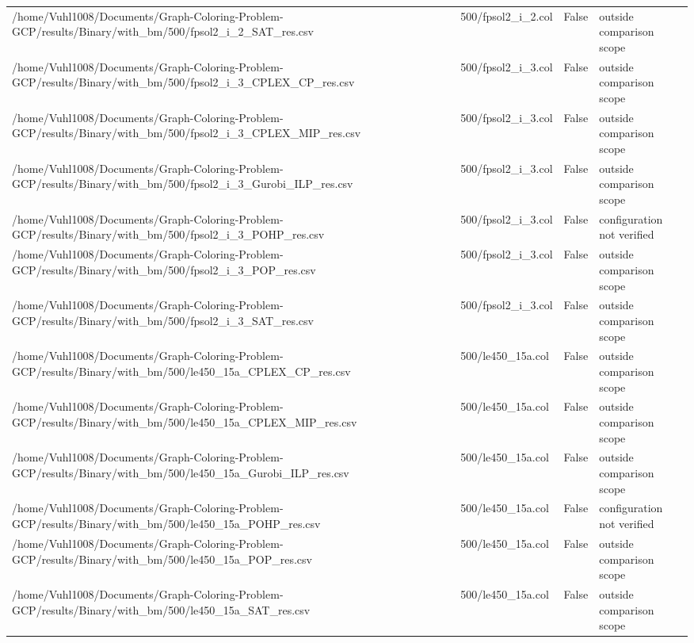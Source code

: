 \begin{table}[htbp]
\begin{tabular}{llll}
/home/Vuhl1008/Documents/Graph-Coloring-Problem-GCP/results/Binary/with\_bm/500/fpsol2\_i\_2\_SAT\_res.csv & 500/fpsol2\_i\_2.col & False & outside comparison scope \\
/home/Vuhl1008/Documents/Graph-Coloring-Problem-GCP/results/Binary/with\_bm/500/fpsol2\_i\_3\_CPLEX\_CP\_res.csv & 500/fpsol2\_i\_3.col & False & outside comparison scope \\
/home/Vuhl1008/Documents/Graph-Coloring-Problem-GCP/results/Binary/with\_bm/500/fpsol2\_i\_3\_CPLEX\_MIP\_res.csv & 500/fpsol2\_i\_3.col & False & outside comparison scope \\
/home/Vuhl1008/Documents/Graph-Coloring-Problem-GCP/results/Binary/with\_bm/500/fpsol2\_i\_3\_Gurobi\_ILP\_res.csv & 500/fpsol2\_i\_3.col & False & outside comparison scope \\
/home/Vuhl1008/Documents/Graph-Coloring-Problem-GCP/results/Binary/with\_bm/500/fpsol2\_i\_3\_POHP\_res.csv & 500/fpsol2\_i\_3.col & False & configuration not verified \\
/home/Vuhl1008/Documents/Graph-Coloring-Problem-GCP/results/Binary/with\_bm/500/fpsol2\_i\_3\_POP\_res.csv & 500/fpsol2\_i\_3.col & False & outside comparison scope \\
/home/Vuhl1008/Documents/Graph-Coloring-Problem-GCP/results/Binary/with\_bm/500/fpsol2\_i\_3\_SAT\_res.csv & 500/fpsol2\_i\_3.col & False & outside comparison scope \\
/home/Vuhl1008/Documents/Graph-Coloring-Problem-GCP/results/Binary/with\_bm/500/le450\_15a\_CPLEX\_CP\_res.csv & 500/le450\_15a.col & False & outside comparison scope \\
/home/Vuhl1008/Documents/Graph-Coloring-Problem-GCP/results/Binary/with\_bm/500/le450\_15a\_CPLEX\_MIP\_res.csv & 500/le450\_15a.col & False & outside comparison scope \\
/home/Vuhl1008/Documents/Graph-Coloring-Problem-GCP/results/Binary/with\_bm/500/le450\_15a\_Gurobi\_ILP\_res.csv & 500/le450\_15a.col & False & outside comparison scope \\
/home/Vuhl1008/Documents/Graph-Coloring-Problem-GCP/results/Binary/with\_bm/500/le450\_15a\_POHP\_res.csv & 500/le450\_15a.col & False & configuration not verified \\
/home/Vuhl1008/Documents/Graph-Coloring-Problem-GCP/results/Binary/with\_bm/500/le450\_15a\_POP\_res.csv & 500/le450\_15a.col & False & outside comparison scope \\
/home/Vuhl1008/Documents/Graph-Coloring-Problem-GCP/results/Binary/with\_bm/500/le450\_15a\_SAT\_res.csv & 500/le450\_15a.col & False & outside comparison scope \\

\end{tabular}
\end{table}
